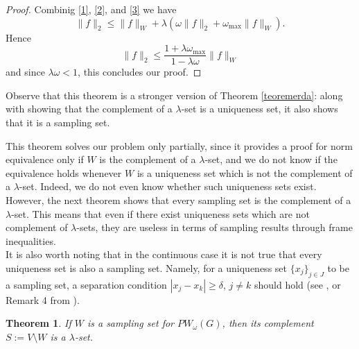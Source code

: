 \documentclass[12pt]{amsart}
\newtheorem{theorem}{Theorem}[section]
\theoremstyle{definition}
\numberwithin{equation}{section}
\theoremstyle{definition}
\theoremstyle{remark}
\numberwithin{equation}{section}
\begin{document}
\begin{proof}
    Combinig \eqref{1}, \eqref{2}, and \eqref{3} we have
    $$
    \|f\|_2 \leq \|f\|_W + \lambda\left(\omega \|f\|_2 + \omega_\mathrm{max}\|f\|_W\right).
    $$
    Hence
    $$
    \|f\|_2 \leq \frac{1 + \lambda \omega_\mathrm{max}}{1 - \lambda\omega}\|f\|_W
    $$
    and since $\lambda\omega < 1$, this concludes our proof.
\end{proof}
Observe that this theorem is a stronger version of Theorem \ref{teoremerda}: along with showing that the complement of a $\lambda$-set is a uniqueness set, it also shows that it is a sampling set.

This theorem solves our problem only partially, since it provides a proof for norm equivalence only if $W$ is the complement of a $\lambda$-set, and we do not know if the equivalence holds whenever $W$ is a uniqueness set which is not the complement of a $\lambda$-set. Indeed, we do not even know whether such uniqueness sets exist. However, the next theorem shows that every sampling set is the complement of a $\lambda$-set. This means that even if there exist uniqueness sets which are not complement of $\lambda$-sets, they are useless in terms of sampling results through frame inequalities.\\
It is also worth noting that in the continuous case it is not true that every uniqueness set is also a sampling set. Namely, for a uniqueness set $\{x_j\}_{j \in J}$ to be a sampling set, a separation condition $|x_j-x_k|\geq\delta$, $j \neq k$ should hold (see \cite{Polya}, or Remark 4 from \cite{PW1}).
\begin{theorem}
\label{iff}
    If $W$ is a sampling set for $PW_\omega(G)$, then its complement $S:= V\setminus W$ is a $\lambda$-set.
\end{theorem}
\end{document}
